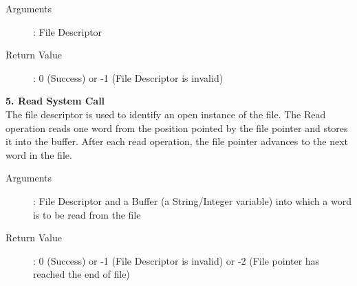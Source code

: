 \documentclass[11pt ,twosided]{article}
\begin{document}
\begin{description}
	\item[Arguments]: File Descriptor
	\item[Return Value]: 0 (Success) or -1 (File Descriptor is invalid)
\end{description} 

\textbf{5. Read System Call}
\vspace{2mm}\\
The file descriptor is used to identify an open instance of the file. The Read operation reads one word from the position pointed by the file pointer and stores it into the buffer. After each read operation, the file pointer advances to the next word in the file. 
\begin{description}
	\item[Arguments]: File Descriptor and a Buffer (a String/Integer variable) into which a word is to be read from the file
	\item[Return Value]: 0 (Success) or -1 (File Descriptor is invalid) or -2 (File pointer has reached the end of file)
\end{description} 
\iffalse
\end{document}
